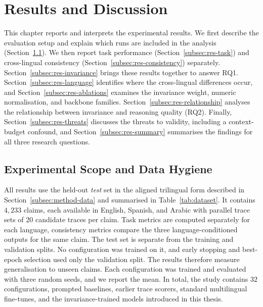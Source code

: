 %

\section{Results and Discussion}
\label{sec:results}

This chapter reports and interprets the experimental results. We first describe the evaluation setup
and explain which runs are included in the analysis (Section~\ref{subsec:res-setup}). We then report
task performance (Section~\ref{subsec:res-task}) and cross-lingual consistency
(Section~\ref{subsec:res-consistency}) separately. Section~\ref{subsec:res-invariance} brings these
results together to answer RQ1. Section~\ref{subsec:res-language} identifies where the cross-lingual
differences occur, and Section~\ref{subsec:res-ablations} examines the invariance weight, numeric
normalisation, and backbone families. Section~\ref{subsec:res-relationship} analyses the relationship
between invariance and reasoning quality (RQ2). Finally, Section~\ref{subsec:res-threats} discusses
the threats to validity, including a context-budget confound, and Section~\ref{subsec:res-summary}
summarises the findings for all three research questions.

\subsection{Experimental Scope and Data Hygiene}
\label{subsec:res-setup}

All results use the held-out \emph{test} set in the aligned trilingual form described in
Section~\ref{subsec:method-data} and summarised in Table~\ref{tab:dataset}. It contains $4{,}233$
claims, each available in English, Spanish, and Arabic with parallel trace sets of $20$ candidate
traces per claim. Task metrics are computed separately for each language, consistency metrics compare
the three language-conditioned outputs for the same claim. The test set
is separate from the training and validation splits. No configuration was trained on it, and early
stopping and best-epoch selection used only the validation split. The results therefore measure
generalisation to unseen claims. Each configuration was trained and evaluated with three random
seeds, and we report the mean. In total, the study contains $32$ configurations, prompted baselines,
earlier trace scorers, standard multilingual fine-tunes, and the invariance-trained models introduced
in this thesis.

